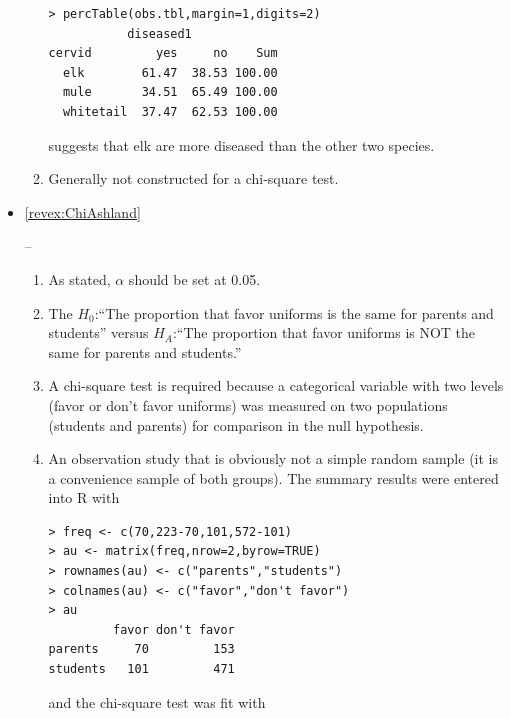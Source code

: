 \documentclass[10pt,openany]{book}\usepackage[]{graphicx}\usepackage[]{color}
\makeatletter
\newenvironment{kframe}{%
 \def\at@end@of@kframe{}%
 \ifinner\ifhmode%
  \def\at@end@of@kframe{\end{minipage}}%
  \begin{minipage}{\columnwidth}%
 \fi\fi%
 \def\FrameCommand##1{\hskip\@totalleftmargin \hskip-\fboxsep
 \colorbox{shadecolor}{##1}\hskip-\fboxsep
     \hskip-\linewidth \hskip-\@totalleftmargin \hskip\columnwidth}%
 \MakeFramed {\advance\hsize-\width
   \@totalleftmargin\z@ \linewidth\hsize
   \@setminipage}}%
 {\par\unskip\endMakeFramed%
 \at@end@of@kframe}
\newenvironment{knitrout}{}{} %
\makeatother
\begin{document}
\begin{itemize}
\begin{enumerate}
\begin{knitrout}
\color{fgcolor}\begin{kframe}
\begin{verbatim}
> percTable(obs.tbl,margin=1,digits=2)
           diseased1
cervid         yes     no    Sum
  elk        61.47  38.53 100.00
  mule       34.51  65.49 100.00
  whitetail  37.47  62.53 100.00
\end{verbatim}
\end{kframe}
\end{knitrout}
suggests that elk are more diseased than the other two species.
      \item Generally not constructed for a chi-square test.
    \end{enumerate}
  \item \hypertarget{ans:ChiAshland}{\ref{revex:ChiAshland}} --
    \begin{enumerate}
      \item As stated, $\alpha$ should be set at 0.05.
      \item The $H_{0}$:``The proportion that favor uniforms is the same for parents and students'' versus $H_{A}$:``The proportion that favor uniforms is NOT the same for parents and students.''
      \item A chi-square test is required because a categorical variable with two levels (favor or don't favor uniforms) was measured on two populations (students and parents) for comparison in the null hypothesis.
      \item An observation study that is obviously not a simple random sample (it is a convenience sample of both groups).  The summary results were entered into R with
\begin{knitrout}
\color{fgcolor}\begin{kframe}
\begin{verbatim}
> freq <- c(70,223-70,101,572-101)
> au <- matrix(freq,nrow=2,byrow=TRUE)
> rownames(au) <- c("parents","students")
> colnames(au) <- c("favor","don't favor")
> au
         favor don't favor
parents     70         153
students   101         471
\end{verbatim}
\end{kframe}
\end{knitrout}
and the chi-square test was fit with
\begin{knitrout}
\color{fgcolor}\begin{kframe}
\begin{verbatim}

\end{verbatim}
\end{kframe}
\end{knitrout}
\end{enumerate}
\end{itemize}
\end{document}
